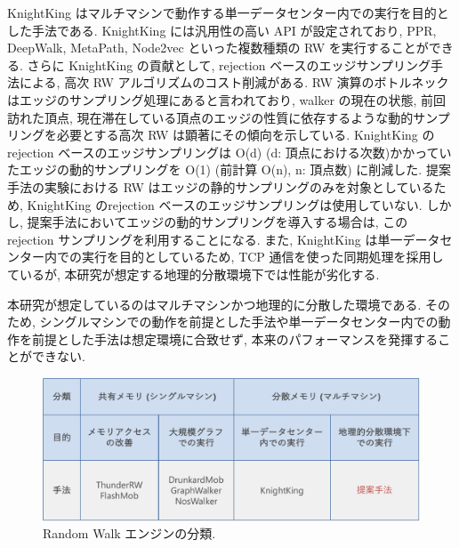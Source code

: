 KnightKing\cite{10.1145/3341301.3359634} はマルチマシンで動作する単一データセンター内での実行を目的とした手法である. KnightKing には汎用性の高い API が設定されており, PPR, DeepWalk, MetaPath, Node2vec といった複数種類の RW を実行することができる. さらに KnightKing の貢献として, rejection ベースのエッジサンプリング手法による, 高次 RW アルゴリズムのコスト削減がある. RW 演算のボトルネックはエッジのサンプリング処理にあると言われており, walker の現在の状態, 前回訪れた頂点, 現在滞在している頂点のエッジの性質に依存するような動的サンプリングを必要とする高次 RW は顕著にその傾向を示している. KnightKing の rejection ベースのエッジサンプリングは O(d) (d: 頂点における次数)かかっていたエッジの動的サンプリングを O(1) (前計算 O(n), n: 頂点数) に削減した. 提案手法の実験における RW はエッジの静的サンプリングのみを対象としているため, KnightKing のrejection ベースのエッジサンプリングは使用していない. しかし, 提案手法においてエッジの動的サンプリングを導入する場合は, この rejection サンプリングを利用することになる. また, KnightKing は単一データセンター内での実行を目的としているため, TCP 通信を使った同期処理を採用しているが, 本研究が想定する地理的分散環境下では性能が劣化する. 

本研究が想定しているのはマルチマシンかつ地理的に分散した環境である. そのため, シングルマシンでの動作を前提とした手法や単一データセンター内での動作を前提とした手法は想定環境に合致せず, 本来のパフォーマンスを発揮することができない. 

\begin{figure}[t]
    \centering
    \includegraphics[scale=0.5]{figure/RWEngine.pdf}
    \caption{Random Walk エンジンの分類.}
    \label{Random Walk エンジンの分類}
\end{figure}

